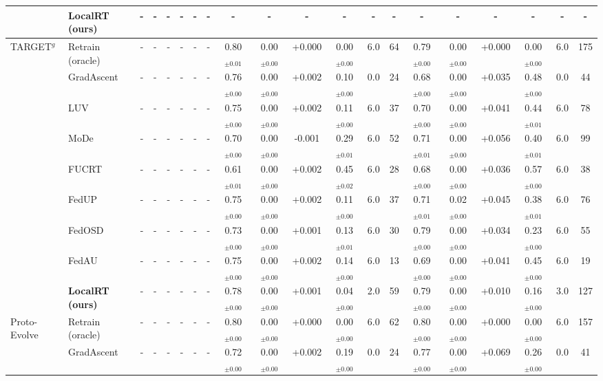 \begin{table}[t]
\begin{tabular}{ll|cccccc|cccccc|cccccc}
 & \textbf{LocalRT (ours)} & - & - & - & - & - & - & - & - & - & - & - & - & - & - & - & - & - & -\\
\midrule
TARGET$^{g}$ & Retrain (oracle) & - & - & - & - & - & - & 0.80$_{\pm0.01}$ & 0.00$_{\pm0.00}$ & +0.000 & 0.00$_{\pm0.00}$ & 6.0 & 64 & 0.79$_{\pm0.00}$ & 0.00$_{\pm0.00}$ & +0.000 & 0.00$_{\pm0.00}$ & 6.0 & 175\\
 & GradAscent & - & - & - & - & - & - & 0.76$_{\pm0.00}$ & 0.00$_{\pm0.00}$ & +0.002 & 0.10$_{\pm0.00}$ & 0.0 & 24 & 0.68$_{\pm0.00}$ & 0.00$_{\pm0.00}$ & +0.035 & 0.48$_{\pm0.00}$ & 0.0 & 44\\
 & LUV & - & - & - & - & - & - & 0.75$_{\pm0.00}$ & 0.00$_{\pm0.00}$ & +0.002 & 0.11$_{\pm0.00}$ & 6.0 & 37 & 0.70$_{\pm0.00}$ & 0.00$_{\pm0.00}$ & +0.041 & 0.44$_{\pm0.01}$ & 6.0 & 78\\
 & MoDe & - & - & - & - & - & - & 0.70$_{\pm0.00}$ & 0.00$_{\pm0.00}$ & -0.001 & 0.29$_{\pm0.01}$ & 6.0 & 52 & 0.71$_{\pm0.01}$ & 0.00$_{\pm0.00}$ & +0.056 & 0.40$_{\pm0.01}$ & 6.0 & 99\\
 & FUCRT & - & - & - & - & - & - & 0.61$_{\pm0.01}$ & 0.00$_{\pm0.00}$ & +0.002 & 0.45$_{\pm0.02}$ & 6.0 & 28 & 0.68$_{\pm0.00}$ & 0.00$_{\pm0.00}$ & +0.036 & 0.57$_{\pm0.00}$ & 6.0 & 38\\
 & FedUP & - & - & - & - & - & - & 0.75$_{\pm0.00}$ & 0.00$_{\pm0.00}$ & +0.002 & 0.11$_{\pm0.00}$ & 6.0 & 37 & 0.71$_{\pm0.01}$ & 0.02$_{\pm0.00}$ & +0.045 & 0.38$_{\pm0.01}$ & 6.0 & 76\\
 & FedOSD & - & - & - & - & - & - & 0.73$_{\pm0.00}$ & 0.00$_{\pm0.00}$ & +0.001 & 0.13$_{\pm0.01}$ & 6.0 & 30 & 0.79$_{\pm0.00}$ & 0.00$_{\pm0.00}$ & +0.034 & 0.23$_{\pm0.00}$ & 6.0 & 55\\
 & FedAU & - & - & - & - & - & - & 0.75$_{\pm0.00}$ & 0.00$_{\pm0.00}$ & +0.002 & 0.14$_{\pm0.00}$ & 6.0 & 13 & 0.69$_{\pm0.00}$ & 0.00$_{\pm0.00}$ & +0.041 & 0.45$_{\pm0.00}$ & 6.0 & 19\\
 & \textbf{LocalRT (ours)} & - & - & - & - & - & - & 0.78$_{\pm0.00}$ & 0.00$_{\pm0.00}$ & +0.001 & 0.04$_{\pm0.00}$ & 2.0 & 59 & 0.79$_{\pm0.00}$ & 0.00$_{\pm0.00}$ & +0.010 & 0.16$_{\pm0.00}$ & 3.0 & 127\\
\midrule
Proto-Evolve & Retrain (oracle) & - & - & - & - & - & - & 0.80$_{\pm0.00}$ & 0.00$_{\pm0.00}$ & +0.000 & 0.00$_{\pm0.00}$ & 6.0 & 62 & 0.80$_{\pm0.00}$ & 0.00$_{\pm0.00}$ & +0.000 & 0.00$_{\pm0.00}$ & 6.0 & 157\\
 & GradAscent & - & - & - & - & - & - & 0.72$_{\pm0.00}$ & 0.00$_{\pm0.00}$ & +0.002 & 0.19$_{\pm0.00}$ & 0.0 & 24 & 0.77$_{\pm0.00}$ & 0.00$_{\pm0.00}$ & +0.069 & 0.26$_{\pm0.00}$ & 0.0 & 41\\

\end{tabular}
\end{table}
